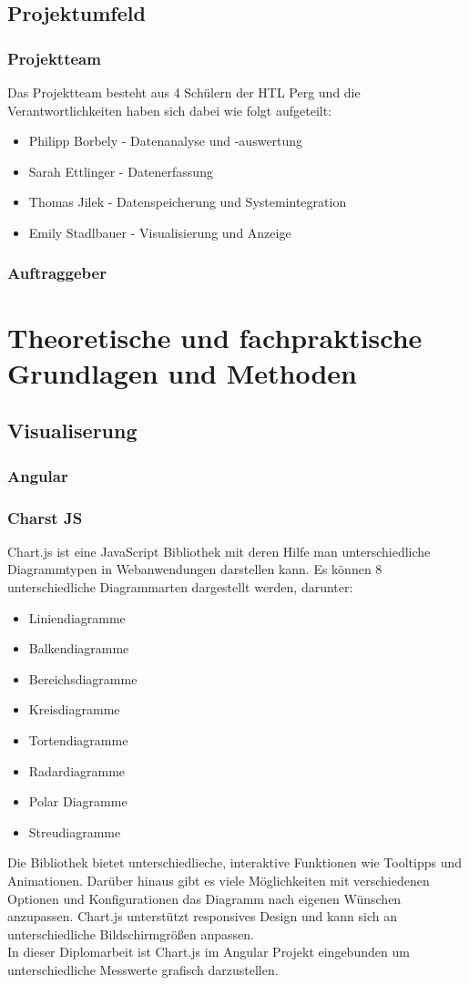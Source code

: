 \documentclass{report}
\begin{document}
\section{Projektumfeld}
\subsection{Projektteam}
Das Projektteam besteht aus 4 Schülern der HTL Perg und die Verantwortlichkeiten haben sich dabei wie folgt aufgeteilt:
\begin{itemize}
    \item Philipp Borbely - Datenanalyse und -auswertung
    \item Sarah Ettlinger - Datenerfassung
    \item Thomas Jilek - Datenspeicherung und Systemintegration
    \item Emily Stadlbauer - Visualisierung und Anzeige
\end{itemize}

\subsection{Auftraggeber}

\chapter{Theoretische und fachpraktische Grundlagen und Methoden}
\section{Visualiserung}
\subsection{Angular}
\subsection{Charst JS}
\text
Chart.js ist eine JavaScript Bibliothek mit deren Hilfe man unterschiedliche Diagrammtypen in Webanwendungen darstellen kann. 
Es können 8 unterschiedliche Diagrammarten dargestellt werden, darunter: 
\begin{itemize}
    \item Liniendiagramme
    \item Balkendiagramme
    \item Bereichsdiagramme
    \item Kreisdiagramme
    \item Tortendiagramme
    \item Radardiagramme
    \item Polar Diagramme
    \item Streudiagramme
\end{itemize}
Die Bibliothek bietet unterschiedlieche, interaktive Funktionen wie Tooltipps und Animationen. 
Darüber hinaus gibt es viele Möglichkeiten mit verschiedenen Optionen und Konfigurationen das Diagramm nach eigenen Wünschen  anzupassen. 
Chart.js unterstützt responsives Design und kann sich an unterschiedliche Bildschirmgrößen anpassen.\\In dieser Diplomarbeit ist Chart.js im Angular Projekt eingebunden um unterschiedliche Messwerte grafisch darzustellen.
\end{document}
